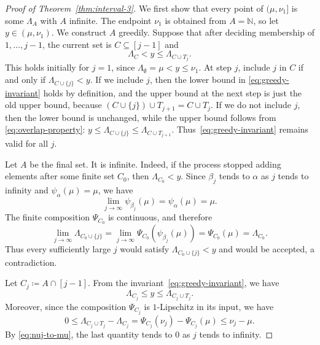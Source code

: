 \documentclass[10pt]{article}
\numberwithin{equation}{section}
\newcommand{\N}{\mathbb{N}}
\begin{document}
\begin{proof}[Proof of Theorem~\ref{thm:interval-3}]
We first show that every point of $(\mu,\nu_1]$ is some $\Lambda_A$ with $A$ infinite. The endpoint $\nu_1$ is obtained from $A=\N$, so let $y\in(\mu,\nu_1)$. We construct $A$ greedily. Suppose that after deciding membership of $1,\ldots,j-1$, the current set is $C\subseteq[j-1]$ and
\begin{equation}
        \Lambda_C<y\le \Lambda_{C\cup T_j}.
        \label{eq:greedy-invariant}
\end{equation}
This holds initially for $j=1$, since $\Lambda_\emptyset=\mu<y\le \nu_1$. At step $j$, include $j$ in $C$ if and only if $\Lambda_{C\cup\{j\}}<y$. If we include $j$, then the lower bound in \eqref{eq:greedy-invariant} holds by definition, and the upper bound at the next step is just the old upper bound, because $(C\cup\{j\})\cup T_{j+1}=C\cup T_j$. If we do not include $j$, then the lower bound is unchanged, while the upper bound follows from \eqref{eq:overlap-property}: $y\le \Lambda_{C\cup\{j\}}\le \Lambda_{C\cup T_{j+1}}$. Thus~\eqref{eq:greedy-invariant} remains valid for all $j$.

Let $A$ be the final set. It is infinite. Indeed, if the process stopped adding elements after some finite set $C_0$, then $\Lambda_{C_0}<y$. Since $\beta_j$ tends to $\alpha$ as $j$ tends to infinity and $\psi_\alpha(\mu)=\mu$, we have
\[
        \lim_{j\to\infty}\psi_{\beta_j}(\mu)=\psi_\alpha(\mu)=\mu .
\]
The finite composition $\Psi_{C_0}$ is continuous, and therefore
\[
        \lim_{j\to\infty}\Lambda_{C_0\cup\{j\}}
        =\lim_{j\to\infty}\Psi_{C_0}(\psi_{\beta_j}(\mu))
        =\Psi_{C_0}(\mu)
        =\Lambda_{C_0}.
\]
Thus every sufficiently large $j$ would satisfy $\Lambda_{C_0\cup\{j\}}<y$ and would be accepted, a contradiction.

Let $C_j\coloneqq A\cap[j-1]$. From the invariant~\eqref{eq:greedy-invariant}, we have 
\begin{equation}
        \Lambda_{C_j}\le y\le \Lambda_{C_j\cup T_j}.
        \label{eq:squeeze1}
\end{equation}
Moreover, since the composition $\Psi_{C_j}$ is $1$-Lipschitz in its input, we have 
\begin{equation}
        0\le \Lambda_{C_j\cup T_j}-\Lambda_{C_j}
        =\Psi_{C_j}(\nu_j)-\Psi_{C_j}(\mu)
        \le \nu_j-\mu .
        \label{eq:squeeze-width}
\end{equation}
By \eqref{eq:nuj-to-mu}, the last quantity tends to $0$ as $j$ tends to infinity.


\end{proof}
\end{document}
